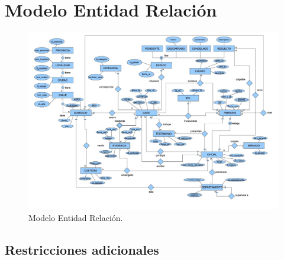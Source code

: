 \section{Modelo Entidad Relación}

\begin{figure}[H]
  \includegraphics[angle=90, width=\linewidth]{figuras/DER_Final.jpg}
  \caption{Modelo Entidad Relación.}
  \label{fig:MER}
\end{figure}

\subsection{Restricciones adicionales}

